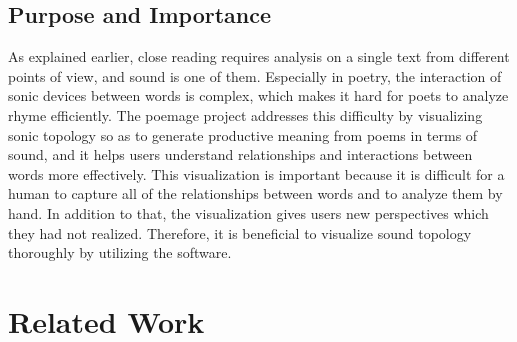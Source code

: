 \documentclass[journal]{vgtc}                %
\begin{document}
\subsection{Purpose and Importance}
As explained earlier, close reading requires analysis on a single text from different points of view, and sound is one of them. Especially in poetry, the interaction of sonic devices between words is complex, which makes it hard for poets to analyze rhyme efficiently. The poemage project addresses this difficulty by visualizing sonic topology so as to generate productive meaning from poems in terms of sound, and it helps users understand relationships and interactions between words more effectively. This visualization is important because it is difficult for a human to capture all of the relationships between words and to analyze them by hand. In addition to that, the visualization gives users new perspectives which they had not realized. Therefore, it is beneficial to visualize sound topology thoroughly by utilizing the software.


\section{Related Work} \label{research}
\end{document}
